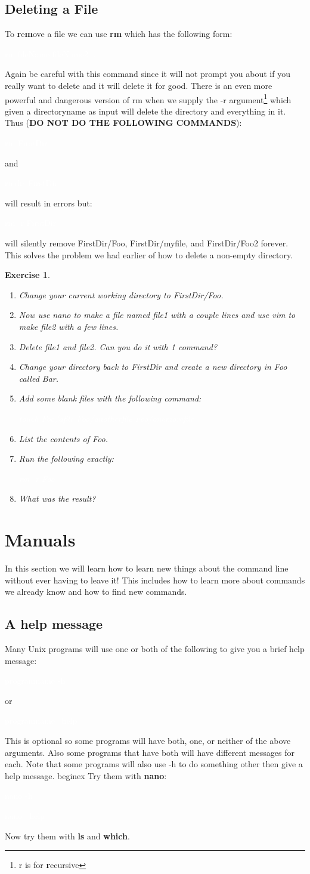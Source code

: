 \documentclass[oneside]{book}
\newcommand{\commandline}[1]{\begin{center} \colorbox{Dark}{\textcolor{white}{#1}} \end{center}}
\newtheorem{ex}{Exercise}[chapter]
\begin{document}
\subsection{Deleting a File}
To \textbf{r}e\textbf{m}ove a file we can use \textbf{rm} which has the following form:
\commandline{rm fileName fileName2 ...}
Again be careful with this command since it will not prompt you about if you really want to delete and it will delete it for good. There is an even more powerful and dangerous version of rm when we supply the -r argument\footnote{r is for \textbf{r}ecursive} which given a directoryname as input will delete the directory and everything in it. 
Thus (\textbf{DO NOT DO THE FOLLOWING COMMANDS}):
\commandline{rm FirstDir}
and
\commandline{rmdir FirstDir}
will result in errors but:
\commandline{rm -r FirstDir} 
will silently remove FirstDir/Foo, FirstDir/myfile, and FirstDir/Foo2 forever. This solves the problem we had earlier of how to delete a non-empty directory. 
\begin{ex}
	\begin{enumerate}
		\item Change your current working directory to FirstDir/Foo.
		\item Now use nano to make a file named file1 with a couple lines and use vim to make file2 with a few lines.
		\item Delete file1 and file2. Can you do it with 1 command?
		\item Change your directory back to FirstDir and create a new directory in Foo called Bar.
		\item Add some blank files with the following command:
		    \commandline{touch Foo/afile Foo/anotherfile Foo/onemorefile}
		\item List the contents of Foo.
		\item Run the following exactly:
		    \commandline{rm -r Foo}
		\item What was the result?
	\end{enumerate}
\end{ex}

\section{Manuals}
In this section we will learn how to learn new things about the command line without ever having to leave it! This includes how to learn more about commands we already know and how to find new commands.
\subsection{ A help message}
Many Unix programs will use one or both of the following to give you a brief help message:
\commandline{programname -h}
or
\commandline{programname --help}
This is optional so some programs will have both, one, or neither of the above arguments. Also some programs that have both will have different messages for each. Note that some programs will also use -h to do something other then give a help message.
begin{ex}
Try them with \textbf{nano}:
	\commandline{nano -h}
	\commandline{nano --help}
	Now try them with \textbf{ls} and \textbf{which}.
\end{document}
